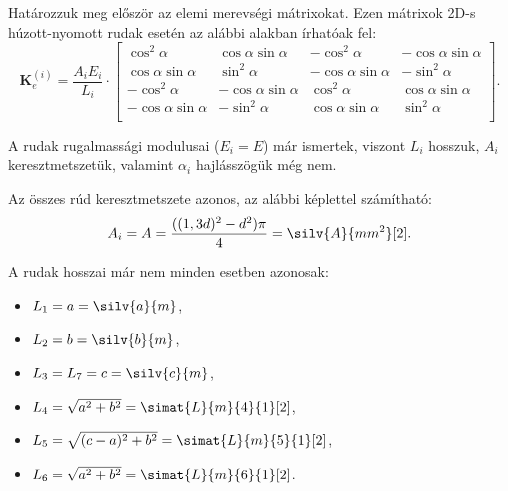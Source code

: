 \documentclass[a4paper, 12pt]{scrartcl}
\newcommand{\rmat}[1]{\mathbf{#1}}
\begin{document}
Határozzuk meg először az elemi merevségi mátrixokat. Ezen mátrixok 2D-s
húzott-nyomott rudak esetén az alábbi alakban írhatóak fel:
\def\a{\alpha}
\begin{equation}
  \rmat{K}_e^{(i)}
  = \frac{A_i E_i}{L_i}
  \cdot
  \begin{bmatrix}
    \cos^2 \a        & \cos \a \sin \a  & -\cos^2 \a       & -\cos \a \sin \a \\
    \cos \a \sin \a  & \sin^2 \a        & -\cos \a \sin \a & -\sin^2 \a       \\
    -\cos^2 \a       & -\cos \a \sin \a & \cos^2 \a        & \cos \a \sin \a  \\
    -\cos \a \sin \a & -\sin^2 \a       & \cos \a \sin \a  & \sin^2 \a        \\
  \end{bmatrix}.
  \label{eq:Ke}
\end{equation}

A rudak rugalmassági modulusai ($E_i = E$) már ismertek, viszont $L_i$ hosszuk,
$A_i$ keresztmetszetük, valamint $\alpha_i$ hajlásszögük még nem.

Az összes rúd keresztmetszete azonos, az alábbi képlettel számítható:
\begin{equation}
  A_i = A = \frac{((1,3d)^2 - d^2)\pi}{4} = \silv{A}{mm^2}[2].
  \label{eq:A}
\end{equation}

A rudak hosszai már nem minden esetben azonosak:

\begin{minipage}[c]{.26\linewidth}
  \begin{itemize}
    \item $L_1 = a = \silv{a}{m}$,
    \item $L_2 = b = \silv{b}{m}$,
  \end{itemize}
\end{minipage}%
\begin{minipage}[c]{.33\linewidth}
  \begin{itemize}
    \item $L_3 = L_7 = c = \silv{c}{m}$,
    \item $L_4 = \sqrt{a^2 + b^2} = \simat{L}{m}{4}{1}[2]$,
  \end{itemize}
\end{minipage}%
\begin{minipage}[c]{.38\linewidth}
  \begin{itemize}
    \item $L_5 = \sqrt{(c - a)^2 + b^2} = \simat{L}{m}{5}{1}[2]$,
    \item $L_6 = \sqrt{a^2 + b^2} = \simat{L}{m}{6}{1}[2]$.
  \end{itemize}
\end{minipage}
\end{document}
